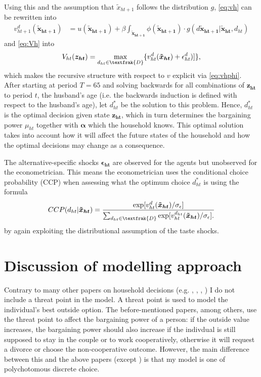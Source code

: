Using this and the assumption that $\tilde{x}_{ht+1}$ follows the distribution $g$, \eqref{eq:vh} can be rewritten into
\begin{align}
v_{ht+1}^d(\boldsymbol{\tilde{x}_{ht+1}})&=u(\boldsymbol{\tilde{x}_{ht+1}}) +\beta \int_{\boldsymbol{\tilde{x}_{ht+1}}}{\phi(\boldsymbol{\tilde{x}_{ht+1}})\cdot g(d\boldsymbol{\tilde{x}_{ht+1}}|\boldsymbol{\tilde{x}_{ht}},d_{ht})}  
\label{eq:vhphi}
\end{align}
and \eqref{eq:Vh} into
\begin{align}
V_{ht}(\boldsymbol{z_{ht}})=\max_{d_{ht}\in \textfrak{D}} \{v_{ht}^d(\boldsymbol{\tilde{x}_{ht}})+\epsilon_{ht}^d)]\},
\label{eq:Vhphi}
\end{align}
which makes the recursive structure with respect to $v$ explicit via \eqref{eq:vhphi}. After starting at period $T=65$ and solving backwards for all combinations of $\boldsymbol{z_{ht}}$ to period $t$, the husband's age (i.e. the backwards induction is defined with respect to the husband's age), let $d_{ht}^*$ be the solution to this problem. Hence, $d_{ht}^*$ is the optimal decision given state $\boldsymbol{z_{ht}}$, which in turn determines the bargaining power $\mu_{ht}$ together with $\boldsymbol{\alpha}$ which the household knows. This optimal solution takes into account how it will affect the future states of the household and how the optimal decisions may change as a consequence. 

The alternative-specific shocks $\boldsymbol{\epsilon_{ht}}$ are observed for the agents but unobserved for the econometrician. This means the econometrician uses the conditional choice probability (CCP) when assessing what the optimum choice $d_{ht}^*$ is using the formula
\begin{align*}
CCP(d_{ht}|\boldsymbol{\tilde{x}_{ht}})=\frac{\exp[v_{ht}^{d}(\boldsymbol{\tilde{x}_{ht}})/ \sigma_{\epsilon}]}{\sum_{d_{ht} \in \textfrak{D}} { \exp[v_{ht}^{d_{ht}}(\boldsymbol{\tilde{x}_{ht}})/ \sigma_{\epsilon}].  }}
\end{align*}
by again exploiting the distributional assumption of the taste shocks. 

\section{Discussion of modelling approach}\label{sec:modeldisc}
Contrary to many other papers on household decisions (e.g. \cite{Voena2015}, \cite{DelbocaFlinn2012}, \cite{Gemici2011}, \cite{LundbergPollak1993}) I do not include a threat point in the model. A threat point is used to model the individual's best outside option. The before-mentioned papers, among others, use the threat point to affect the bargaining power of a person: if the outside value increases, the bargaining power should also increase if the indivdual is still supposed to stay in the couple or to work cooperatively, otherwise it will request a divorce or choose the non-cooperative outcome. However, the main difference between this and the above papers (except \cite{Gemici2011}) is that my model is one of polychotomous discrete choice. 

